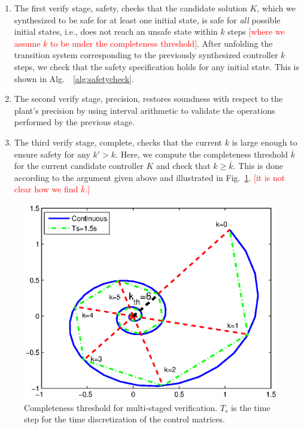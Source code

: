 \documentclass[twocolumn]{autart}    %
\renewcommand{\note}[1]{\textcolor{red}{[#1]}}
\begin{document}
\begin{enumerate}
\item The first {\sc verify} stage, {\sc safety}, checks that the candidate
solution $K$, which we synthesized to be safe for at least one initial
state, is safe for \emph{all} possible initial states, i.e., does not reach
an unsafe state within $k$ steps \note{where we assume $k$ to be under the
completeness threshold}.  After unfolding the transition system corresponding
to the previously synthesized controller $k$ steps, we check that the safety
specification holds for any initial state. This is shown in Alg.~~\ref{alg:safetycheck}. 

\item The second {\sc verify} stage, {\sc precision}, 
 restores soundness with respect to the plant's precision
by using interval arithmetic \cite{moore1966interval} to validate the 
operations performed by the previous stage. 

\item The third {\sc verify} stage, {\sc complete}, checks that the current
$k$ is large enough to ensure safety for any $k'{>}k$.  Here, we compute the
completeness threshold $\overline{k}$ for the current candidate controller $K$ and
check that $k{\geq}\overline{k}$.  This is done according to the argument
given above and illustrated in Fig.~\ref{fig:ct}. 
\note{it is not clear how we find $\overline{k}$.}

\end{enumerate}

\begin{figure}[t]
\centering
\includegraphics[width=\columnwidth]{figures/ct.eps}
\caption{Completeness threshold for multi-staged verification. $T_s$ is the time step for the time discretization of the control matrices.}
\label{fig:ct}
\end{figure}
\end{document}
